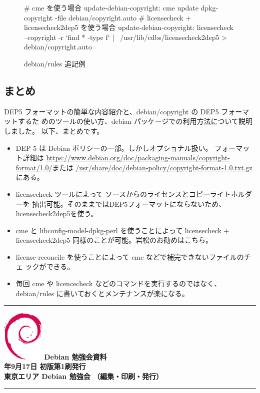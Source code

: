 \documentclass[mingoth,a4paper]{jsarticle}
\newcommand{\debmtgyear}{2016}
\newcommand{\debmtgmonth}{9}
\newcommand{\debmtgdate}{17}
\begin{document}
\begin{figure}[htbp]
\begin{center}
\begin{commandline}
# cme を使う場合
update-debian-copyright:
	cme update dpkg-copyright -file debian/copyright.auto
# licensecheck + licensecheck2dep5 を使う場合
update-debian-copyright:
        licensecheck --copyright -r `find * -type f` | \
                /usr/lib/cdbs/licensecheck2dep5 > debian/copyright.auto
\end{commandline}
\end{center}
\caption{debian/rules 追記例}
\label{fig:example-update-rules}
\end{figure}

\subsection{まとめ}

DEP5 フォーマットの簡単な内容紹介と、debian/copyright の DEP5 フォーマットするた
めのツールの使い方、debian パッケージでの利用方法について説明しました。
以下、まとめです。
\begin{itemize}
\item DEP 5 は Debian ポリシーの一部。しかしオプショナル扱い。
フォーマット詳細は
\url{https://www.debian.org/doc/packaging-manuals/copyright-format/1.0/}または
\url{/usr/share/doc/debian-policy/copyright-format-1.0.txt.gz}にある。

\item licensecheck ツールによって ソースからのライセンスとコピーライトホルダーを
抽出可能。そのままではDEP5フォーマットにならないため、licensecheck2dep5を使う。
\item cme と libconfig-model-dpkg-perl を使うことによって licensecheck +
licensecheck2dep5 同様のことが可能。岩松のお勧めはこちら。
\item license-reconcile を使うことによって cme などで補完できないファイルのチェ
ックができる。
\item 毎回 cme や licencecheck などのコマンドを実行するのではなく、debian/rules 
に書いておくとメンテナンスが楽になる。
\end{itemize}

%
\mbox{}\newpage


\vspace*{15cm}
\hrule
\vspace{2mm}
\includegraphics[width=2cm]{image200502/openlogo-nd.eps}
\noindent \Large \bf Debian 勉強会資料\\
\noindent \normalfont \debmtgyear{}年\debmtgmonth{}月\debmtgdate{}日 \hspace{5mm}  初版第1刷発行\\
\noindent \normalfont 東京エリア Debian 勉強会 （編集・印刷・発行）\\
\hrule
\end{document}
